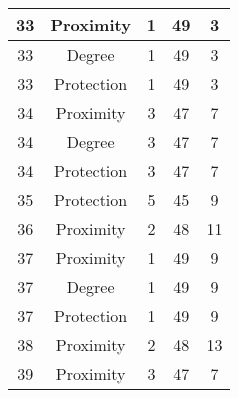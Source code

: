 \documentclass[results.tex]{subfiles}
\begin{document}
\begin{center}
\begin{tabular}{| c || c | c | c | c |}
            \hline
            33                      & Proximity                    & 1                      & 49                      & 3                    \\
            \hline
            33                      & Degree                       & 1                      & 49                      & 3                    \\
            \hline
            33                      & Protection                   & 1                      & 49                      & 3                    \\
            \hline
            34                      & Proximity                    & 3                      & 47                      & 7                    \\
            \hline
            34                      & Degree                       & 3                      & 47                      & 7                    \\
            \hline
            34                      & Protection                   & 3                      & 47                      & 7                    \\
            \hline
            35                      & Protection                   & 5                      & 45                      & 9                    \\
            \hline
            36                      & Proximity                    & 2                      & 48                      & 11                   \\
            \hline
            37                      & Proximity                    & 1                      & 49                      & 9                    \\
            \hline
            37                      & Degree                       & 1                      & 49                      & 9                    \\
            \hline
            37                      & Protection                   & 1                      & 49                      & 9                    \\
            \hline
            38                      & Proximity                    & 2                      & 48                      & 13                   \\
            \hline
            39                      & Proximity                    & 3                      & 47                      & 7                    \\

\end{tabular}
\end{center}
\end{document}

